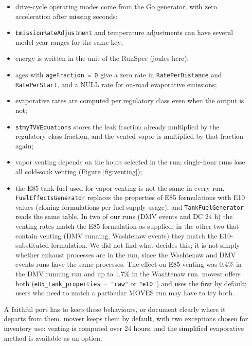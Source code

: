 \documentclass[preprint,
3p]{elsarticle} %
\providecommand{\tightlist}{%
  \setlength{\itemsep}{0pt}\setlength{\parskip}{0pt}}
\begin{document}
\begin{itemize}
\tightlist
\item
  drive-cycle operating modes come from the Go generator, with zero
  acceleration after missing seconds;
\item
  \texttt{EmissionRateAdjustment} and temperature adjustments can have
  several model-year ranges for the same key;
\item
  energy is written in the unit of the RunSpec (joules here);
\item
  ages with \texttt{ageFraction\ =\ 0} give a zero rate in
  \texttt{RatePerDistance} and \texttt{RatePerStart}, and a NULL rate
  for on-road evaporative emissions;
\item
  evaporative rates are computed per regulatory class even when the
  output is not;
\item
  \texttt{stmyTVVEquations} stores the leak fraction already multiplied
  by the regulatory-class fraction, and the vented vapor is multiplied
  by that fraction again;
\item
  vapor venting depends on the hours selected in the run; single-hour
  runs lose all cold-soak venting (Figure \ref{fig:venting});
\item
  the E85 tank fuel used for vapor venting is not the same in every run.
  \texttt{FuelEffectsGenerator} replaces the properties of E85
  formulations with E10 values (cloning formulations per fuel-supply
  usage), and \texttt{TankFuelGenerator} reads the same table. In two of
  our runs (DMV events and DC 24 h) the venting rates match the E85
  formulation as supplied; in the other two that contain venting (DMV
  running, Washtenaw events) they match the E10-substituted formulation.
  We did not find what decides this; it is not simply whether exhaust
  processes are in the run, since the Washtenaw and DMV events runs have
  the same processes. The effect on E85 venting was 0.4\% in the DMV
  running run and up to 1.7\% in the Washtenaw run. movesr offers both
  (\texttt{e85\_tank\_properties\ =\ "raw"} or \texttt{"e10"}) and uses
  the first by default; users who need to match a particular MOVES run
  may have to try both.
\end{itemize}

A faithful port has to keep these behaviours, or document clearly where
it departs from them. movesr keeps them by default, with two exceptions
chosen for inventory use: venting is computed over 24 hours, and the
simplified evaporative method is available as an option.
\end{document}

